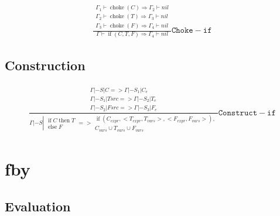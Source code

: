 \documentclass{scrartcl}
\DeclareMathOperator{\ifop}{if}
\DeclareMathOperator{\thenop}{then}
\DeclareMathOperator{\elseop}{else}
\DeclareMathOperator{\choke}{choke}
\begin{document}
    \begin{align*}
    \frac{
        \begin{matrix}
        \Gamma_1 \vdash \choke(C) \Rightarrow \Gamma_2 \vdash nil \\
        \Gamma_2 \vdash \choke(T) \Rightarrow \Gamma_3 \vdash nil \\
        \Gamma_3 \vdash \choke(F) \Rightarrow \Gamma_4 \vdash nil
        \end{matrix}
    }{
        \Gamma \vdash \ifop(C, T, F) \Rightarrow \Gamma_4 \vdash nil
    }\mathtt{Choke-if}
    \end{align*}
    
    \subsection{Construction}
    
    \begin{align*}
    \frac{
        \begin{matrix}
        \Gamma |- S | C => \Gamma |- S_1 | C_{e} \\
        \Gamma |- S_1 | Tsrc => \Gamma |- S_2 | T_{e} \\
        \Gamma |- S_2 | Fsrc => \Gamma |- S_3 | F_{e}
        \end{matrix}
    }
    {\Gamma |- S \left| \begin{matrix}
        \ifop C \thenop T \\
        \elseop F
        \end{matrix} \right. =>
        \begin{matrix}
        \ifop(C_{expr}, <T_{expr}, T_{vars}>, <F_{expr}, F_{vars}>), \\
        C_{vars} \cup T_{vars} \cup F_{vars}
        \end{matrix}
    }\mathtt{Construct-if}
    \end{align*}
    
    \section{fby}
    
    \subsection{Evaluation}
    
\end{document}
